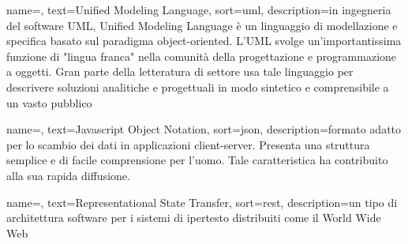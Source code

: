 {
    name=,
    text=Unified Modeling Language,
    sort=uml,
    description={in ingegneria del software UML, Unified Modeling Language è un linguaggio di modellazione e specifica basato sul paradigma object-oriented. L'UML svolge un’importantissima funzione di "lingua franca" nella comunità della progettazione e programmazione a oggetti. Gran parte della letteratura di settore usa tale linguaggio per descrivere soluzioni analitiche e progettuali in modo sintetico e comprensibile a un vasto pubblico}
}

{
    name=,
    text=Javascript Object Notation,
    sort=json,
    description={formato adatto per lo scambio dei dati in applicazioni client-server. Presenta una struttura semplice e di facile comprensione per l’uomo. Tale caratteristica ha contribuito alla sua rapida diffusione.}
}

{
    name=,
    text=Representational State Transfer,
    sort=rest,
    description={un tipo di architettura software per i sistemi di ipertesto distribuiti come il World Wide Web}
}

